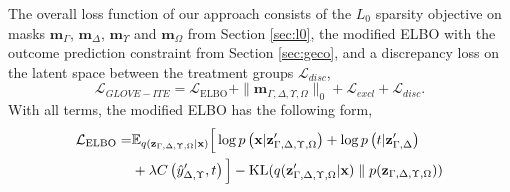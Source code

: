 \documentclass[doubleblind]{ecai}
\begin{document}
	The overall loss function of our approach consists of the $L_0$ sparsity objective on masks $\mathbf{m}_{\Gamma}$,  $\mathbf{m}_{\Delta}$, $\mathbf{m}_{\Upsilon}$ and $\mathbf{m}_{\Omega}$ from Section \ref{sec:l0}, the modified ELBO with the outcome prediction constraint from Section \ref{sec:geco}, and a discrepancy loss on the latent space between the treatment groups $\mathcal{L}_\mathit{disc}$, 
	\begin{equation}
		\mathcal{L}_\mathit{GLOVE-ITE}=\mathcal{L}_{\text{ELBO}} + \|\mathbf{m}_{\Gamma, \Delta, \Upsilon,\Omega}\|_0 + \mathcal{L}_{\mathit{excl}}+\mathcal{L}_\mathit{disc}
		\label{eq:overall}
		.
	\end{equation}
	With all terms, the modified ELBO has the following form,
	\begin{equation}
		\begin{aligned}
			\mathcal{L}_{\text{ELBO}} 
			= 
			& 
			\mathbb{E}_{q(\mathbf{z}_{\Gamma,\Delta,\Upsilon,\Omega} | \mathbf{x})} 
			\Big[
			\log p\left( \mathbf{x} | \bold{z}_{\Gamma , \Delta , \Upsilon,\Omega}^\prime  \right)
			+ 
			\log p\left( t | \bold{z}_{\Gamma,\Delta}^\prime \right)\\
			&
			+
			\lambda C\left(\hat{y}_{\Delta , \Upsilon}^\prime, t \right)
			\Big]
			- 
			\mathrm{KL}(q(\bold{z}_{\Gamma,\Delta, \Upsilon,\Omega}^\prime   | \mathbf{x}) \parallel p(\bold{z}_{\Gamma,\Delta, \Upsilon,\Omega}))
		\end{aligned}  
		\label{eq:elbo-mod}
	\end{equation}

	
	
	
\end{document}
